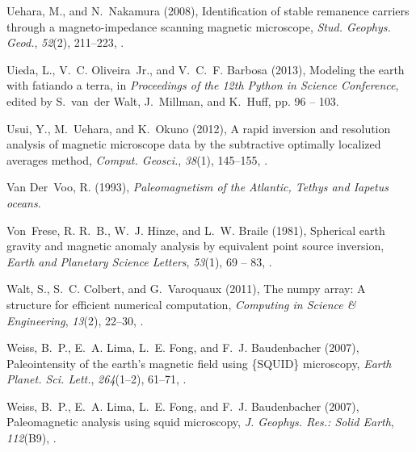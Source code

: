 \documentclass[draft,gc]{agutex}
\begin{document}
\begin{article}
\begin{thebibliography}{56}
Uehara, M., and N.~Nakamura (2008), Identification of stable remanence carriers
  through a magneto-impedance scanning magnetic microscope, \textit{Stud.
  Geophys. Geod.}, \textit{52}(2), 211--223, .

Uieda, L., V.~C. Oliveira~Jr., and V.~C.~F. Barbosa (2013), Modeling the earth
  with fatiando a terra, in \textit{Proceedings of the 12th Python in Science
  Conference}, edited by S.~van~der Walt, J.~Millman, and K.~Huff, pp. 96 --
  103.

Usui, Y., M.~Uehara, and K.~Okuno (2012), A rapid inversion and resolution
  analysis of magnetic microscope data by the subtractive optimally localized
  averages method, \textit{Comput. Geosci.}, \textit{38}(1), 145--155,
  .

Van Der~Voo, R. (1993), \textit{Paleomagnetism of the Atlantic, Tethys and
  Iapetus oceans}.

Von~Frese, R. R.~B., W.~J. Hinze, and L.~W. Braile (1981), Spherical earth
  gravity and magnetic anomaly analysis by equivalent point source inversion,
  \textit{Earth and Planetary Science Letters}, \textit{53}(1), 69 -- 83,
  .

Walt, S., S.~C. Colbert, and G.~Varoquaux (2011), The numpy array: A structure
  for efficient numerical computation, \textit{Computing in Science \&
  Engineering}, \textit{13}(2), 22--30, .

Weiss, B.~P., E.~A. Lima, L.~E. Fong, and F.~J. Baudenbacher
  (2007{}), Paleointensity of the earth's magnetic field using
  \{SQUID\} microscopy, \textit{Earth Planet. Sci. Lett.}, \textit{264}(1–2),
  61--71, .

Weiss, B.~P., E.~A. Lima, L.~E. Fong, and F.~J. Baudenbacher
  (2007{}), Paleomagnetic analysis using squid microscopy,
  \textit{J. Geophys. Res.: Solid Earth}, \textit{112}(B9),
  .


\end{thebibliography}
\end{article}
\end{document}
